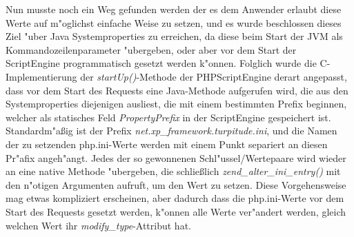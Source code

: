 Nun musste noch ein Weg gefunden werden der es dem Anwender erlaubt diese Werte auf m"oglichst einfache Weise zu setzen, und es wurde beschlossen dieses
Ziel "uber Java Systemproperties zu erreichen, da diese beim Start der JVM als Kommandozeilenparameter "ubergeben, oder aber vor dem Start der ScriptEngine 
programmatisch gesetzt werden k"onnen. Folglich wurde die C-Implementierung der \emph{startUp()}-Methode der PHPScriptEngine derart angepasst, dass vor dem 
Start des Requests eine Java-Methode aufgerufen wird, die aus den Systemproperties diejenigen ausliest,  die mit einem bestimmten Prefix beginnen, welcher 
als statisches Feld \emph{PropertyPrefix} in der ScriptEngine gespeichert ist.
Standardm"a\ss ig ist der Prefix \emph{net.xp\_framework.turpitude.ini}, und die Namen der zu setzenden php.ini-Werte werden mit einem Punkt separiert an diesen
Pr"afix angeh"angt. Jedes der so gewonnenen Schl"ussel/Wertepaare wird wieder an eine native Methode "ubergeben, die schlie\ss lich \emph{zend\_alter\_ini\_entry()}
mit den n"otigen Argumenten aufruft, um den Wert zu setzen. Diese Vorgehensweise mag etwas kompliziert erscheinen, aber dadurch dass die php.ini-Werte vor dem
Start des Requests gesetzt werden, k"onnen alle Werte ver"andert werden, gleich welchen Wert ihr \emph{modify\_type}-Attribut hat.


